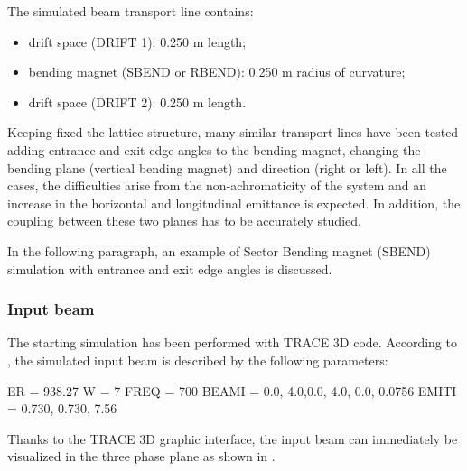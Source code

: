 The simulated beam transport line contains:
\begin{itemize}
\item drift space (DRIFT 1): 0.250 m length;
\item bending magnet (SBEND or RBEND): 0.250 m radius of curvature;
\item drift space (DRIFT 2): 0.250 m length.
\end{itemize}

Keeping fixed the lattice structure, many similar transport lines have been tested adding entrance and exit edge angles to the bending magnet, changing the bending plane (vertical bending magnet) and direction (right or left). In all the cases, the difficulties arise from the non-achromaticity of the system and an increase in the horizontal and longitudinal emittance is expected. In addition, the coupling between these two planes has to be accurately studied.

In the following paragraph, an example of Sector Bending magnet (SBEND) simulation with entrance and exit edge angles is discussed.

\subsubsection{Input beam}
The starting simulation has been performed with TRACE 3D code. According to , the simulated input beam is described by the following parameters:
\begin{example}
ER = 938.27
W = 7
FREQ = 700
BEAMI = 0.0, 4.0,0.0, 4.0, 0.0, 0.0756
EMITI = 0.730, 0.730, 7.56
\end{example}

Thanks to the TRACE 3D graphic interface, the input beam can immediately be visualized in the three phase plane as shown in .

